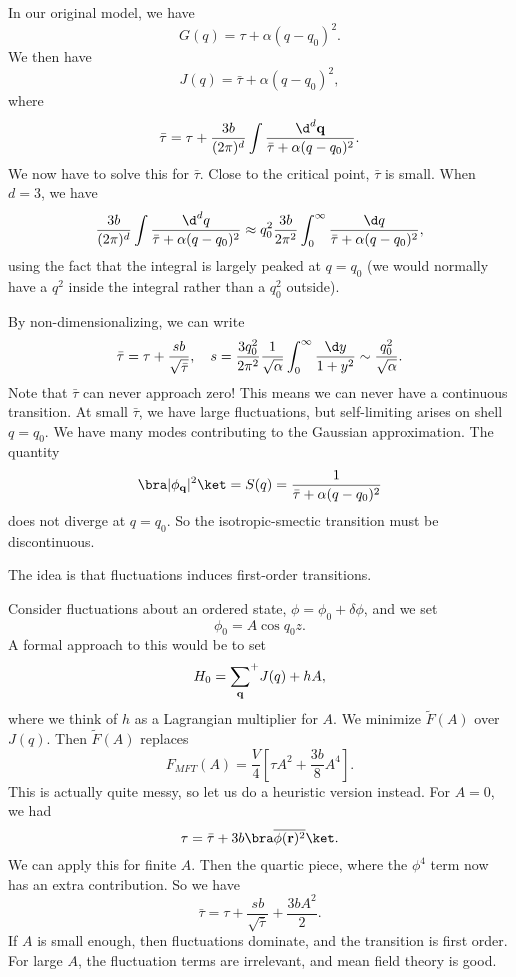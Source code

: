 \documentclass[a4paper]{article}
\newcommand\splus{\!{\vphantom{\prod}}^+}
\begin{document}
In our original model, we have
\[
  G(q) = \tau + \alpha(q - q_0)^2.
\]
We then have
\[
  J(q) = \bar{\tau} + \alpha (q - q_0)^2,
\]
where
\[
  \bar{\tau} = \tau + \frac{3b}{(2\pi)^d} \int \frac{\d^d \mathbf{q}}{\bar{\tau} + \alpha(q - q_0)^2}.
\]
We now have to solve this for $\bar{\tau}$. Close to the critical point, $\bar{\tau}$ is small. When $d = 3$, we have
\[
  \frac{3b}{(2\pi)^d} \int \frac{\d^d q}{\bar{\tau} + \alpha (q - q_0)^2} \approx q_0^2 \frac{3b}{2\pi^2} \int_0^\infty \frac{\d q}{\bar{\tau} + \alpha (q - q_0)^2},
\]
using the fact that the integral is largely peaked at $q = q_0$ (we would normally have a $q^2$ inside the integral rather than a $q_0^2$ outside). %

By non-dimensionalizing, we can write
\[
  \bar{\tau} = \tau + \frac{sb}{\sqrt{\bar{\tau}}},\quad s = \frac{3q_0^2}{2\pi^2} \frac{1}{\sqrt{\alpha}} \int_0^\infty \frac{\d y}{1 + y^2} \sim \frac{q_0^2}{\sqrt{\alpha}}. %
\]
Note that $\bar{\tau}$ can never approach zero! This means we can never have a continuous transition. At small $\bar{\tau}$, we have large fluctuations, but self-limiting arises on shell $q = q_0$. We have many modes contributing to the Gaussian approximation. The quantity
\[
  \bra |\phi_\mathbf{q}|^2 \ket = S(q) = \frac{1}{\bar{\tau} + \alpha(q - q_0)^2}
\]
does not diverge at $q = q_0$. So the isotropic-smectic transition must be discontinuous.

The idea is that fluctuations induces first-order transitions.

Consider fluctuations about an ordered state, $\phi = \phi_0 + \delta \phi$, and we set
\[
  \phi_0 = A \cos q_0 z.
\]
A formal approach to this would be to set
\[
  H_0 = \sum_{\mathbf{q}} \splus J(q) + hA,
\]
where we think of $h$ as a Lagrangian multiplier for $A$. We minimize $\tilde{F}(A)$ over $J(q)$. Then $\tilde{F}(A)$ replaces
\[
  F_{MFT}(A) = \frac{V}{4} \left[\tau A^2 + \frac{3b}{8} A^4\right].
\]
This is actually quite messy, so let us do a heuristic version instead. For $A = 0$, we had
\[
  \tau = \bar{\tau} + 3b \bra \overline{\phi(\mathbf{r})^2}\ket.
\]
We can apply this for finite $A$. Then the quartic piece, where the $\phi^4$ term now has an extra contribution. So we have
\[
  \bar{\tau} = \tau + \frac{sb}{\sqrt{\bar{\tau}}} + \frac{3b A^2}{2}.
\]
If $A$ is small enough, then fluctuations dominate, and the transition is first order. For large $A$, the fluctuation terms are irrelevant, and mean field theory is good.
\end{document}
